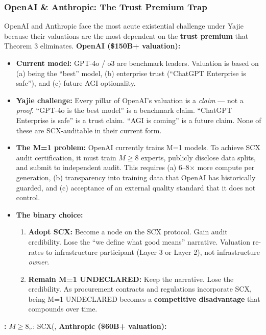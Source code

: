 \documentclass[12pt,a4paper]{article}
\theoremstyle{remark}
\begin{document}
\subsubsection{OpenAI \& Anthropic: The Trust Premium Trap}
OpenAI and Anthropic face the most acute existential challenge under Yajie 
because their valuations are the most dependent on the \textbf{trust premium} 
that Theorem 3 eliminates.
\textbf{OpenAI (\$150B+ valuation):}
\begin{itemize}
 \item \textbf{Current model:} GPT-4o / o3 are benchmark leaders. 
 Valuation is based on (a) being the ``best'' model, (b) enterprise 
 trust (``ChatGPT Enterprise is safe''), and (c) future AGI 
 optionality.
 \item \textbf{Yajie challenge:} Every pillar of OpenAI's valuation is 
 a \textit{claim} --- not a \textit{proof}. ``GPT-4o is the best 
 model'' is a benchmark claim. ``ChatGPT Enterprise is safe'' is 
 a trust claim. ``AGI is coming'' is a future claim. None of 
 these are SCX-auditable in their current form.
 \item \textbf{The M=1 problem:} OpenAI currently trains M=1 models. 
 To achieve SCX audit certification, it must train $M \geq 8$ 
 experts, publicly disclose data splits, and submit to independent 
 audit. This requires (a) 6--8$\times$ more compute per generation, 
 (b) transparency into training data that OpenAI has historically 
 guarded, and (c) acceptance of an external quality standard that 
 it does not control.
 \item \textbf{The binary choice:} 
 \begin{enumerate}[label=\textbf{Option \Alph*}, leftmargin=*]
 \item \textbf{Adopt SCX:} Become a node on the SCX protocol. 
 Gain audit credibility. Lose the ``we define what good 
 means'' narrative. Valuation re-rates to infrastructure 
 participant (Layer 3 or Layer 2), not infrastructure 
 \textit{owner}.
 \item \textbf{Remain M=1 UNDECLARED:} Keep the narrative. 
 Lose the credibility. As procurement contracts and 
 regulations incorporate SCX, being M=1 UNDECLARED 
 becomes a \textbf{competitive disadvantage} that 
 compounds over time.
 \end{enumerate}
\end{itemize}
\noindent\textbf{: }
$M \geq 8$,.: SCX(, 
\textbf{Anthropic (\$60B+ valuation):}
\end{document}
